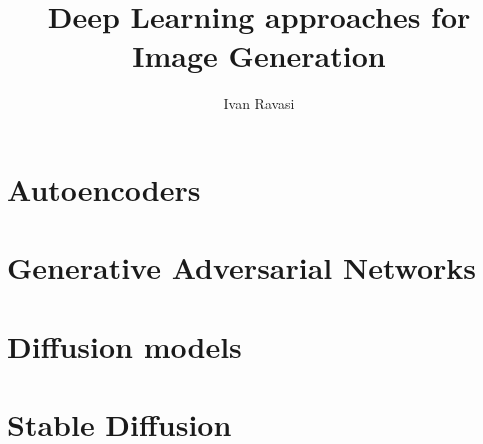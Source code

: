 \documentclass[xcolor=dvipsnames]{beamer}
\title[Image generation through DL]{Deep Learning approaches for Image Generation}
\author[I. Ravasi]{Ivan Ravasi}
\begin{document}
    \frame{\titlepage}
    
    \section{Autoencoders}
    
    \section{Generative Adversarial Networks}
    
    \section{Diffusion models}
    
    \section{Stable Diffusion}
    
\end{document}
